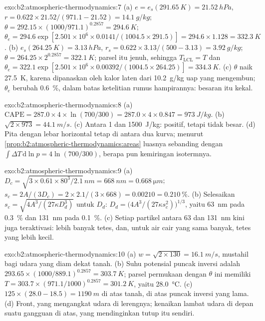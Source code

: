 \begin{solution}{exo:b2:atmospheric-thermodynamics:7}
(a) $e = e_s(\qty{291.65}{K}) = \qty{21.52}{hPa}$, $r = 0.622 \times 21.52/(971.1 - 21.52) =
\qty{14.1}{g/kg}$; $\theta = 292.15 \times (1000/971.1)^{0.2857} = \qty{294.6}{K}$; $\theta_e =
294.6 \exp[2.501 \times 10^6 \times 0.0141/(1004.5 \times 291.5)] = 294.6 \times 1.128 =
\qty{332.3}{K}$. (b) $e_s(\qty{264.25}{K}) = \qty{3.13}{hPa}$, $r_s = 0.622 \times 3.13/(500 -
3.13) = \qty{3.92}{g/kg}$; $\theta = 264.25 \times 2^{0.2857} = \qty{322.1}{K}$; parsel itu
jenuh, sehingga $T_{\text{LCL}} = T$ dan $\theta_e = 322.1 \exp[2.501 \times 10^6 \times
0.00392/(1004.5 \times 264.25)] = \qty{334.3}{K}$. (c) $\theta$ naik \qty{27.5}{K}, karena dipanaskan
oleh kalor laten dari \qty{10.2}{g/kg} uap yang mengembun; $\theta_e$ berubah
\qty{0.6}{\percent}, dalam batas ketelitian rumus hampirannya: besaran itu kekal.
\end{solution}

\begin{solution}{exo:b2:atmospheric-thermodynamics:8}
(a) $\text{CAPE} = 287.0 \times 4 \times \ln(700/300) = 287.0 \times 4 \times 0.847 =
\qty{973}{J/kg}$. (b) $\sqrt{2 \times 973} = \qty{44.1}{m/s}$. (c) Antara 1 dan
\qty{1500}{J/kg}: positif, tetapi tidak besar. (d) Pita dengan lebar horizontal tetap di antara dua
kurva; menurut \cref{prop:b2:atmospheric-thermodynamics:areas} luasnya sebanding dengan $\int
\Delta T\,\mathrm{d}\ln p = 4 \ln(700/300)$, berapa pun kemiringan isotermnya.
\end{solution}

\begin{solution}{exo:b2:atmospheric-thermodynamics:9}
(a) $D_c = \sqrt{3 \times 0.61 \times 80^3/2.1}\,\unit{nm} = \qty{668}{nm} =
\qty{0.668}{\micro m}$; $s_c = 2A/(3D_c) = 2 \times 2.1/(3 \times 668) = 0.00210 =
\qty{0.210}{\percent}$. (b) Selesaikan $s_c = \sqrt{4A^3/(27\kappa D_d^3)}$ untuk $D_d$: $D_d =
\bigl(4A^3/(27\kappa s_c^2)\bigr)^{1/3}$, yaitu \qty{63}{nm} pada \qty{0.3}{\percent} dan \qty{131}{nm} pada
\qty{0.1}{\percent}. (c) Setiap partikel antara 63 dan \qty{131}{nm} kini juga teraktivasi: lebih banyak
tetes, dan, untuk air cair yang sama banyak, tetes yang lebih kecil.
\end{solution}

\begin{solution}{exo:b2:atmospheric-thermodynamics:10}
(a) $w = \sqrt{2 \times 130} = \qty{16.1}{m/s}$, mustahil bagi udara yang diam dekat tanah.
(b) Suhu potensial puncak inversi adalah $293.65 \times (1000/889.1)^{0.2857} =
\qty{303.7}{K}$; parsel permukaan dengan $\theta$ ini memiliki $T = 303.7 \times (971.1/1000)^{0.2857}
= \qty{301.2}{K}$, yaitu \qty{28.0}{\celsius}. (c) $125 \times (28.0 - 18.5) = \qty{1190}{m}$ di atas
tanah, di atas puncak inversi yang lama. (d) Front, yang mengangkat udara di lerengnya; kenaikan lambat
udara di depan suatu gangguan di atas, yang mendinginkan tutup itu sendiri.
\end{solution}

